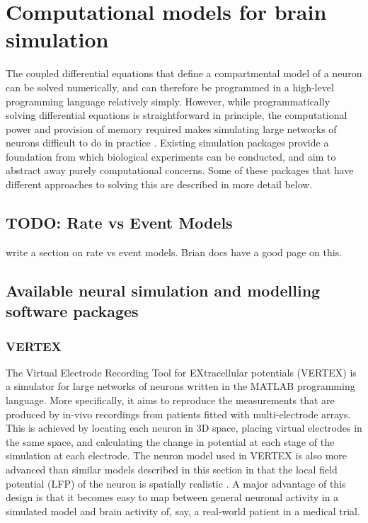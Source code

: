 

\section{Computational models for brain simulation}

The coupled differential equations that define a compartmental model of a neuron
can be solved numerically, and can therefore be programmed in a high-level
programming language relatively simply. However, while programmatically solving
differential equations is straightforward in principle, the computational power
and provision of memory required makes simulating large networks of neurons
difficult to do in practice \autocite{trappenberg_fundamentals_2009}. Existing
simulation packages provide a foundation from which biological experiments can
be conducted, and aim to abstract away purely computational concerns. Some of
these packages that have different approaches to solving this are described in
more detail below.

\subsection{TODO: Rate vs Event Models}
write a section on rate vs event models. Brian docs have a good page on this.

\subsection{Available neural simulation and modelling software packages}

\subsubsection{VERTEX}
The Virtual Electrode Recording Tool for EXtracellular potentials (VERTEX) is a
simulator for large networks of neurons written in the MATLAB programming
language. More specifically, it aims to reproduce the measurements that are
produced by in-vivo recordings from patients fitted with multi-electrode
arrays. This is achieved by locating each neuron in 3D space, placing virtual
electrodes in the same space, and calculating the change in potential at each
stage of the simulation at each electrode. The neuron model used in VERTEX is
also more advanced than similar models described in this section in that the
local field potential (LFP) of the neuron is spatially realistic
\autocite{tomsett_virtual_2015}. A major advantage of this design is that it
becomes easy to map between general neuronal activity in a simulated model and
brain activity of, say, a real-world patient in a medical trial.

